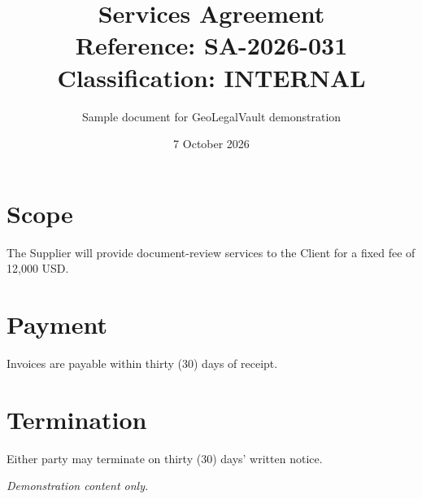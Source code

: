 \documentclass[11pt,a4paper]{article}
\title{\textbf{Services Agreement}\\[2pt]\large Reference: SA-2026-031 \quad Classification: INTERNAL}
\author{Sample document for GeoLegalVault demonstration}
\date{7 October 2026}
\begin{document}
\maketitle

\section{Scope}
The Supplier will provide document-review services to the Client for a fixed fee of 12{,}000 USD.

\section{Payment}
Invoices are payable within thirty (30) days of receipt.

\section{Termination}
Either party may terminate on thirty (30) days' written notice.

\medskip
\small\textit{Demonstration content only.}
\end{document}
